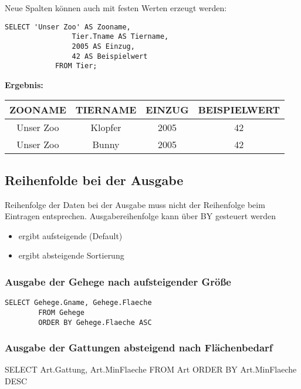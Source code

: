     \begin{tcolorbox}[gray={Beispiel mit festen Werten}]
        Neue Spalten können auch mit festen Werten erzeugt werden:
        \begin{lstlisting}[style=sqlstyle]
            SELECT 'Unser Zoo' AS Zooname,
                Tier.Tname AS Tiername,
                2005 AS Einzug,
                42 AS Beispielwert
            FROM Tier;
        \end{lstlisting}

        \textbf{Ergebnis:}
        \begin{center}
            \begin{tabular}{|c|c|c|c|}
                \hline
                \textbf{ZOONAME} & \textbf{TIERNAME} & \textbf{EINZUG} & \textbf{BEISPIELWERT} \\
                \hline
                Unser Zoo & Klopfer & 2005 & 42 \\
                \hline
                Unser Zoo & Bunny & 2005 & 42 \\
                \hline
            \end{tabular}
        \end{center}
    \end{tcolorbox}

\subsection{Reihenfolde bei der Ausgabe}
    Reihenfolge der Daten bei der Ausgabe muss nicht der Reihenfolge beim Eintragen entsprechen. Ausgabereihenfolge kann über  BY gesteuert werden
    \begin{itemize}
        \item {} ergibt aufsteigende (Default)
        \item {}  ergibt absteigende Sortierung
    \end{itemize}

    \subsubsection{Ausgabe der Gehege nach aufsteigender Größe}
    \begin{lstlisting}[style=sqlstyle]
    SELECT Gehege.Gname, Gehege.Flaeche
        FROM Gehege
        ORDER BY Gehege.Flaeche ASC
    \end{lstlisting}

    \subsubsection{Ausgabe der Gattungen absteigend nach Flächenbedarf}
    \begin{sql}
        SELECT Art.Gattung, Art.MinFlaeche
            FROM Art
            ORDER BY Art.MinFlaeche DESC
    \end{sql}

